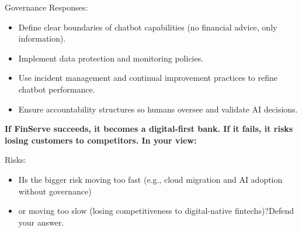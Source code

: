 Governance Responses:

\begin{itemize}
    \item Define clear boundaries of chatbot capabilities (no financial advice, only information).
    \item Implement data protection and monitoring policies.
    \item Use incident management and continual improvement practices to refine chatbot performance.
    \item Ensure accountability structures so humans oversee and validate AI decisions.
\end{itemize}


\bigskip

\noindent\textbf{If FinServe succeeds, it becomes a digital-first bank. If it fails, it risks losing customers to competitors. In your view:}


Risks:
\begin{itemize}
    \item IIs the bigger risk moving too fast (e.g., cloud migration and AI adoption without governance)
    \item or moving too slow (losing competitiveness to digital-native fintechs)?Defend your answer.
\end{itemize}
